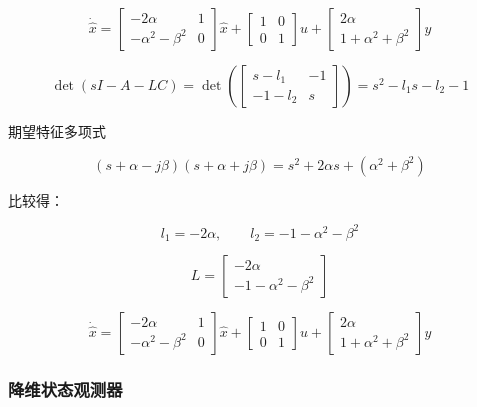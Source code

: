 \begin{example}
\begin{enumerate}
        \[
        \dot{\hat{x}}
        =
        \begin{bmatrix}
        -2\alpha & 1\\
        -\alpha^2-\beta^2 & 0
        \end{bmatrix}\hat{x}
        +
        \begin{bmatrix}
        1 & 0\\
        0 & 1
        \end{bmatrix}u
        +
        \begin{bmatrix}
        2\alpha\\
        1+\alpha^2+\beta^2
        \end{bmatrix}y
        \]
    \end{enumerate}

        \[
    \det(sI-A-LC)
    =
    \det
    \left(
    \begin{bmatrix}
    s-l_1 & -1\\
    -1-l_2 & s
    \end{bmatrix}
    \right)
    =s^2-l_1s-l_2-1
    \]

    期望特征多项式

    \[
    (s+\alpha-j\beta)(s+\alpha+j\beta)
    =s^2+2\alpha s+(\alpha^2+\beta^2)
    \]

    比较得：

    \[
    l_1=-2\alpha,\qquad l_2=-1-\alpha^2-\beta^2
    \]

    \[
    L=
    \begin{bmatrix}
    -2\alpha\\
    -1-\alpha^2-\beta^2
    \end{bmatrix}
    \]

    \[
    \dot{\hat{x}}
    =
    \begin{bmatrix}
    -2\alpha & 1\\
    -\alpha^2-\beta^2 & 0
    \end{bmatrix}\hat{x}
    +
    \begin{bmatrix}
    1 & 0\\
    0 & 1
    \end{bmatrix}u
    +
    \begin{bmatrix}
    2\alpha\\
    1+\alpha^2+\beta^2
    \end{bmatrix}y
    \]
\end{example}

\subsubsection{降维状态观测器}

